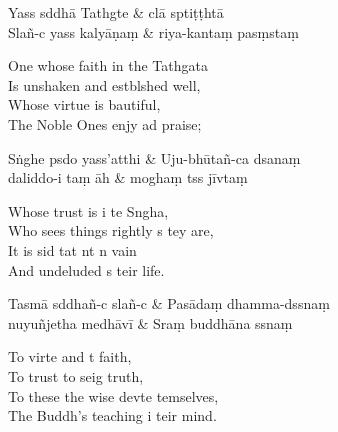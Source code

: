 \begin{leader}
\end{leader}

\begin{twochants}
  Yass sddhā Tathgte & clā sptiṭṭhtā \\
  Slañ-c yass kalyāṇaṃ & riya-kantaṃ pasṃstaṃ \\
\end{twochants}

\begin{english}
  One whose faith in the Tathgata\\
  Is unshaken and estblshed well,\\
  Whose virtue is bautiful,\\
  The Noble Ones enjy ad praise;
\end{english}

\begin{twochants}
  Sṅghe psdo yass'atthi & Uju-bhūtañ-ca dsanaṃ \\
  daliddo-i taṃ āh & moghaṃ tss jīvtaṃ \\
\end{twochants}

\begin{english}
  Whose trust is i te Sngha,\\
  Who sees things rightly s tey are,\\
  It is sid tat nt n vain\\
  And undeluded s teir life.
\end{english}

\begin{twochants}
  Tasmā sddhañ-c slañ-c & Pasādaṃ dhamma-dssnaṃ \\
  nuyuñjetha medhāvī & Sraṃ buddhāna ssnaṃ \\
\end{twochants}

\begin{english}
  To virte and t faith,\\
  To trust to seig truth,\\
  To these the wise devte temselves,\\
  The Buddh's teaching i teir mind.
\end{english}

